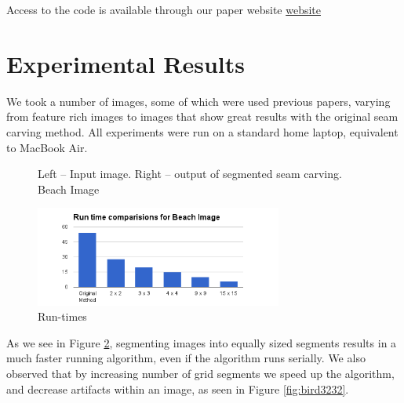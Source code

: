 \documentclass[conference]{acmsiggraph}
\begin{document}
Access to the code is available through our paper website  \href{https://github.com/tomerwei/seamCarving/blob/master/paper/acmsiggraph/cs269.pdf?raw=true}{website}


\section{Experimental Results}

We took a number of images, some of which were used previous papers, varying from feature rich images to images that show great results with the original seam carving method. All experiments were run on a standard home laptop, equivalent to MacBook Air.


\begin{figure}[ht]       
    \caption{Left -- Input image. Right -- output of segmented seam carving. Beach Image}
    \label{materialflowChart}
\end{figure}


\begin{figure}[ht]
  \centering
  \includegraphics[width=3.2in]{images/beach}
  \caption{ Run-times}
  \label{fig:runtimes}
\end{figure}


As we see in Figure \ref{fig:runtimes}, segmenting images into equally sized segments results in a much faster running algorithm, even if the algorithm runs serially. We also observed that by increasing number of grid segments we speed up the algorithm, and decrease artifacts within an image, as seen in Figure \ref{fig:bird3232}.
\end{document}

